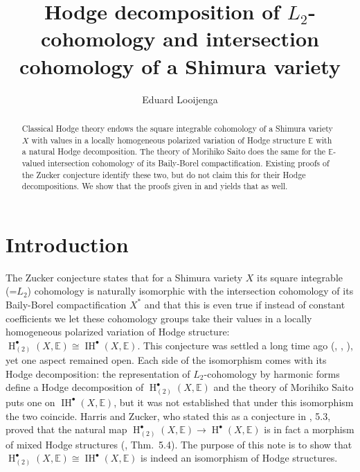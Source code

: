 \documentclass[12pt,letterpaper]{amsart}
\title[$L_2$ Hodge structure]{ Hodge decomposition  of  $L_2$-cohomology and intersection cohomology 
of  a Shimura variety}
\author{Eduard Looijenga}
\numberwithin{equation}{section}
\def\EE{{\mathbb E}}
\def\pt{{\scriptscriptstyle\bullet}}
\newcommand\Hl{\operatorname{H}}
\newcommand\IH{\operatorname{IH}}
\theoremstyle{remark}
\begin{document}

\maketitle
\begin{abstract}
Classical Hodge theory  endows the square integrable  cohomology of a Shimura variety $X$ with values in 
a locally homogeneous  polarized variation of Hodge structure $\EE$ with a natural Hodge decomposition.
The theory of Morihiko Saito does the same for the $\EE$-valued  intersection  cohomology of its Baily-Borel compactification. Existing  proofs  of the Zucker conjecture identify these two, but do not claim this for their Hodge decompositions. We show that the proofs given in  \cite{looij:l2} and \cite{lr} yields that as well.
\end{abstract}

\section*{Introduction}
The Zucker conjecture states that for a Shimura variety $X$ its square integrable (=$L_2$) cohomology is naturally isomorphic with 
the intersection cohomology of its Baily-Borel compactification $X^*$ and that this is even  true if instead of constant coefficients 
we let these cohomology groups take their values in a  locally homogeneous polarized variation of Hodge structure: $\Hl^\pt_{(2)}(X,\EE)\cong \IH^\pt(X,\EE)$.
This conjecture was settled a long time ago (\cite{looij:l2}, \cite{ss}, \cite{lr}), yet one aspect remained open. 
Each side of the isomorphism comes with its Hodge decomposition: the representation of $L_2$-cohomology 
by harmonic  forms define a Hodge decomposition of $\Hl^\pt_{(2)}(X,\EE)$ and the theory of Morihiko Saito 
\cite{saito:hmodules} puts one on $\IH^\pt(X,\EE)$, but it was not established that under this isomorphism  
the two coincide.  Harris and Zucker, who  stated this as a conjecture in \cite{hz}, 5.3,  proved  that the natural map  
$\Hl^\pt_{(2)}(X,\EE)\to \Hl^\pt(X, \EE)$ is in fact a 
morphism of mixed Hodge structures (\cite{hz}, Thm.\ 5.4). The purpose of this note is to show that 
$\Hl^\pt_{(2)}(X,\EE)\cong \IH^\pt(X,\EE)$ is  indeed an isomorphism of Hodge structures.
 
\end{document}

